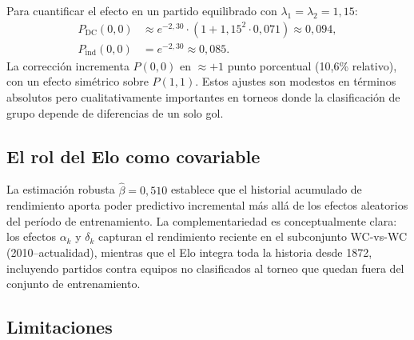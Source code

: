 \documentclass[12pt,a4paper]{article}
\begin{document}
Para cuantificar el efecto en un partido equilibrado con
$\lambda_1 = \lambda_2 = 1{,}15$:
\begin{align}
  P_{\text{DC}}(0,0)  &\approx e^{-2{,}30} \cdot (1 + 1{,}15^2 \cdot 0{,}071) \approx 0{,}094, \\
  P_{\text{ind}}(0,0) &= e^{-2{,}30} \approx 0{,}085.
\end{align}
La corrección incrementa $P(0,0)$ en $\approx +1$ punto porcentual
(10{,}6\% relativo), con un efecto simétrico sobre $P(1,1)$.
Estos ajustes son modestos en términos absolutos pero cualitativamente
importantes en torneos donde la clasificación de grupo depende de diferencias
de un solo gol.

\subsection{El rol del Elo como covariable}

La estimación robusta $\hat{\beta} = 0{,}510$ establece que el historial
acumulado de rendimiento aporta poder predictivo incremental más allá de
los efectos aleatorios del período de entrenamiento.
La complementariedad es conceptualmente clara: los efectos $\alpha_k$ y
$\delta_k$ capturan el rendimiento reciente en el subconjunto WC-vs-WC
(2010--actualidad), mientras que el Elo integra toda la historia desde 1872,
incluyendo partidos contra equipos no clasificados al torneo que quedan fuera
del conjunto de entrenamiento.

\subsection{Limitaciones}
\end{document}
